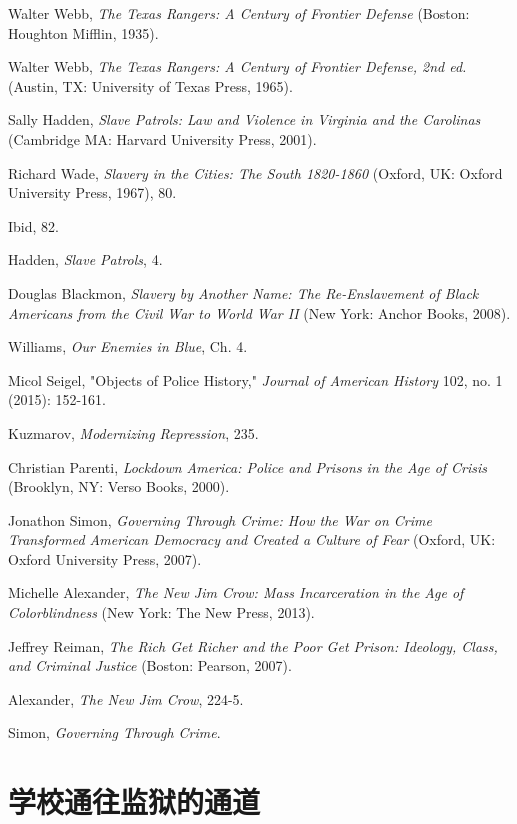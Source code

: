 \documentclass[fontset=fandol, a4paper, 12pt, openright]{ctexbook}
\begin{document}
\begin{enumerate}[label={[\arabic*]}]
    \item Walter Webb, \textit{The Texas Rangers: A Century of Frontier Defense} (Boston: Houghton Mifflin, 1935).
    \item Walter Webb, \textit{The Texas Rangers: A Century of Frontier Defense, 2nd ed.} (Austin, TX: University of Texas Press, 1965).
    \item Sally Hadden, \textit{Slave Patrols: Law and Violence in Virginia and the Carolinas} (Cambridge MA: Harvard University Press, 2001).
    \item Richard Wade, \textit{Slavery in the Cities: The South 1820-1860} (Oxford, UK: Oxford University Press, 1967), 80.
    \item Ibid, 82.
    \item Hadden, \textit{Slave Patrols}, 4.
    \item Douglas Blackmon, \textit{Slavery by Another Name: The Re-Enslavement of Black Americans from the Civil War to World War II} (New York: Anchor Books, 2008).
    \item Williams, \textit{Our Enemies in Blue}, Ch. 4.
    \item Micol Seigel, "Objects of Police History," \textit{Journal of American History} 102, no. 1 (2015): 152-161.
    \item Kuzmarov, \textit{Modernizing Repression}, 235.
    \item Christian Parenti, \textit{Lockdown America: Police and Prisons in the Age of Crisis} (Brooklyn, NY: Verso Books, 2000).
    \item Jonathon Simon, \textit{Governing Through Crime: How the War on Crime Transformed American Democracy and Created a Culture of Fear} (Oxford, UK: Oxford University Press, 2007).
    \item Michelle Alexander, \textit{The New Jim Crow: Mass Incarceration in the Age of Colorblindness} (New York: The New Press, 2013).
    \item Jeffrey Reiman, \textit{The Rich Get Richer and the Poor Get Prison: Ideology, Class, and Criminal Justice} (Boston: Pearson, 2007).
    \item Alexander, \textit{The New Jim Crow}, 224-5.
    \item Simon, \textit{Governing Through Crime}.
\end{enumerate}

\chapter{学校通往监狱的通道}
\end{document}
